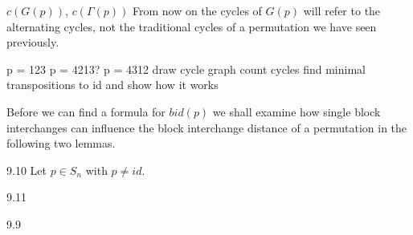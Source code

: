 \begin{definition}
$c(G(p))$, $c(\Gamma (p))$
From now on the cycles of $G(p)$ will refer to the alternating cycles, not the traditional cycles of a permutation we have seen previously. 
\end{definition}

\begin{example}
p = 123
p = 4213?
p = 4312
draw cycle graph
count cycles
find minimal transpositions to id and show how it works
\end{example}

Before we can find a formula for $bid(p)$ we shall examine how single block interchanges can influence the block interchange distance of a permutation in the following two lemmas.

\begin{lemma}
9.10
Let $p \in S_n$ with $p \neq id$. 
\end{lemma}

\begin{lemma}
9.11

\end{lemma}

\begin{theorem}
9.9
\end{theorem}



\begin{appendix}


\end{appendix}

